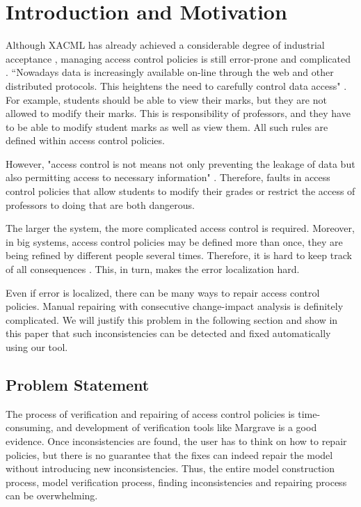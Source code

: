 \documentclass{acm_proc_article-sp}
\begin{document}

\section{Introduction and Motivation}

Although XACML has already achieved a considerable degree of industrial acceptance \cite{acp:alloy}, managing access control policies is still error-prone and complicated \cite{acp:automated}. ``Nowadays data is increasingly available on-line through the web and other distributed protocols. This heightens the need to carefully control data access" \cite{Fisler:2005:VCA:1062455.1062502}. For example, students should be able to view their marks, but they are not allowed to modify their marks. This is responsibility of professors, and they have to be able to modify student marks as well as view them. All such rules are defined within access control policies.

However, "access control is not means not only preventing the leakage of data but also permitting access to necessary information" \cite{Fisler:2005:VCA:1062455.1062502}. Therefore, faults in access control policies that allow students to modify their grades or restrict the access of professors to doing that are both dangerous.

The larger the system, the more complicated access control is required. Moreover, in big systems, access control policies may be defined more than once, they are being refined by different people several times. Therefore, it is hard to keep track of all consequences \cite{Fisler:2005:VCA:1062455.1062502}. This, in turn, makes the error localization hard.

Even if error is localized, there can be many ways to repair access control policies. Manual repairing with consecutive change-impact analysis is definitely complicated. We will justify this problem in the following section and show in this paper that such inconsistencies can be detected and fixed automatically using our tool.

\subsection{Problem Statement}

The process of verification and repairing of access control policies is time-consuming, and development of verification tools like Margrave \cite{Fisler:2005:VCA:1062455.1062502} is a good evidence. Once inconsistencies are found, the user has to think on how to repair policies, but there is no guarantee that the fixes can indeed repair the model without introducing new inconsistencies. Thus, the entire model construction process, model verification process, finding inconsistencies and repairing process can be overwhelming.
\end{document}

